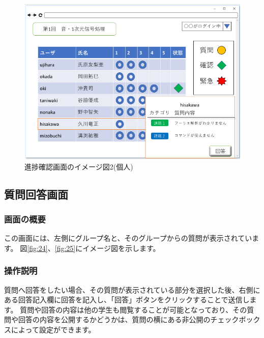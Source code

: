 \begin{figure}[phtbp]
  \begin{center}
    \includegraphics[width=1\linewidth,clip]{./img/23.png}
    \caption{進捗確認画面のイメージ図2(個人)}\label{fig:23}
  \end{center}
\end{figure}

\newpage

\subsection{質問回答画面}
\subsubsection{画面の概要}
この画面には、左側にグループ名と、そのグループからの質問が表示されています。
図\ref{fig:24}、\ref{fig:25}にイメージ図を示します。

\subsubsection{操作説明}
質問へ回答をしたい場合、その質問が表示されている部分を選択した後、右側にある回答記入欄に回答を記入し、「回答」ボタンをクリックすることで送信します。
質問や回答の内容は他の学生も閲覧することが可能となっており、その質問や回答の内容を公開するかどうかは、質問の横にある非公開のチェックボックスによって設定ができます。


